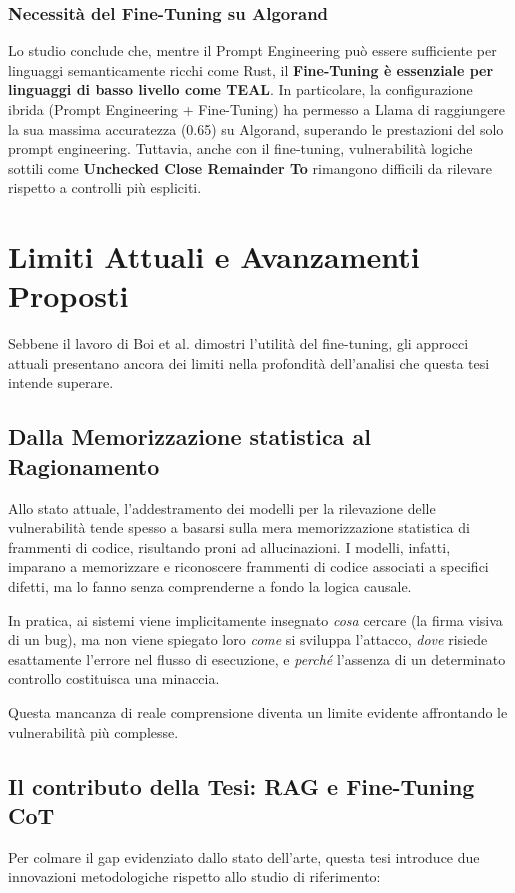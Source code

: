 \subsubsection{Necessità del Fine-Tuning su Algorand}
Lo studio conclude che, mentre il Prompt Engineering può essere sufficiente per linguaggi semanticamente ricchi come Rust, il \textbf{Fine-Tuning è essenziale per linguaggi di basso livello come TEAL}.
In particolare, la configurazione ibrida (Prompt Engineering + Fine-Tuning) ha permesso a Llama di raggiungere la sua massima accuratezza (0.65) su Algorand, superando le prestazioni del solo prompt engineering. Tuttavia, anche con il fine-tuning, vulnerabilità logiche sottili come \textbf{Unchecked Close Remainder To} rimangono difficili da rilevare rispetto a controlli più espliciti.

\section{Limiti Attuali e Avanzamenti Proposti}
Sebbene il lavoro di Boi et al. dimostri l'utilità del fine-tuning, gli approcci attuali presentano ancora dei limiti nella profondità dell'analisi che questa tesi intende superare.

\subsection{Dalla Memorizzazione statistica al Ragionamento}
Allo stato attuale, l'addestramento dei modelli per la rilevazione delle vulnerabilità tende spesso a basarsi sulla mera memorizzazione statistica di frammenti di codice, risultando proni ad allucinazioni. I modelli, infatti, imparano a memorizzare e riconoscere frammenti di codice associati a specifici difetti, ma lo fanno senza comprenderne a fondo la logica causale. 

In pratica, ai sistemi viene implicitamente insegnato \textit{cosa} cercare (la firma visiva di un bug), ma non viene spiegato loro \textit{come} si sviluppa l'attacco, \textit{dove} risiede esattamente l'errore nel flusso di esecuzione, e \textit{perché} l'assenza di un determinato controllo costituisca una minaccia.

Questa mancanza di reale comprensione diventa un limite evidente affrontando le vulnerabilità più complesse.

\subsection{Il contributo della Tesi: RAG e Fine-Tuning CoT}
Per colmare il gap evidenziato dallo stato dell'arte, questa tesi introduce due innovazioni metodologiche rispetto allo studio di riferimento:


